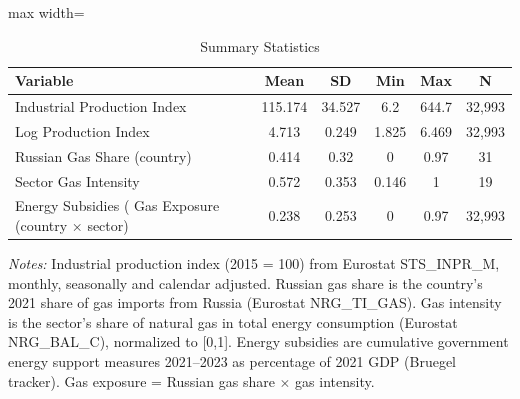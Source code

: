 \begin{table}[htbp]
\centering
\caption{Summary Statistics}
\label{tab:summary}
\begin{adjustbox}{max width=\textwidth}
\begin{tabular}{lccccc}
\hline\hline
Variable & Mean & SD & Min & Max & N \\
\hline
Industrial Production Index & 115.174 & 34.527 & 6.2 & 644.7 & 32,993 \\
Log Production Index & 4.713 & 0.249 & 1.825 & 6.469 & 32,993 \\
Russian Gas Share (country) & 0.414 & 0.32 & 0 & 0.97 & 31 \\
Sector Gas Intensity & 0.572 & 0.353 & 0.146 & 1 & 19 \\
Energy Subsidies (%
Gas Exposure (country × sector) & 0.238 & 0.253 & 0 & 0.97 & 32,993 \\
\hline\hline
\end{tabular}
\end{adjustbox}
\begin{minipage}{0.95\textwidth}
\footnotesize
\textit{Notes:} Industrial production index (2015 = 100) from Eurostat STS\_INPR\_M, monthly, seasonally and calendar adjusted. Russian gas share is the country's 2021 share of gas imports from Russia (Eurostat NRG\_TI\_GAS). Gas intensity is the sector's share of natural gas in total energy consumption (Eurostat NRG\_BAL\_C), normalized to [0,1]. Energy subsidies are cumulative government energy support measures 2021--2023 as percentage of 2021 GDP (Bruegel tracker). Gas exposure = Russian gas share $\times$ gas intensity.
\end{minipage}
\end{table}

